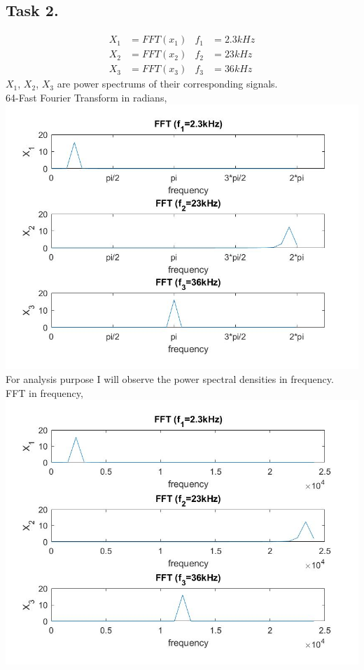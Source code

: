 \documentclass{article}
\begin{document}
    \subsection{Task 2.}
        \begin{align*}
            X_1&=FFT(x_1) & f_1&=2.3kHz\\
            X_2&=FFT(x_2) & f_2&=23kHz\\
            X_3&=FFT(x_3) & f_3&=36kHz
        \end{align*}
        $X_1$, $X_2$, $X_3$ are power spectrums of their corresponding signals.\\
        \vspace{5mm}
        64-Fast Fourier Transform in radians,
        \includegraphics[width=\textwidth]{task2b.jpg}
        \newpage
        For analysis purpose I will observe the power spectral densities in frequency.\\
        FFT in frequency,
        \includegraphics[width=\textwidth]{task2a.jpg}
\end{document}
